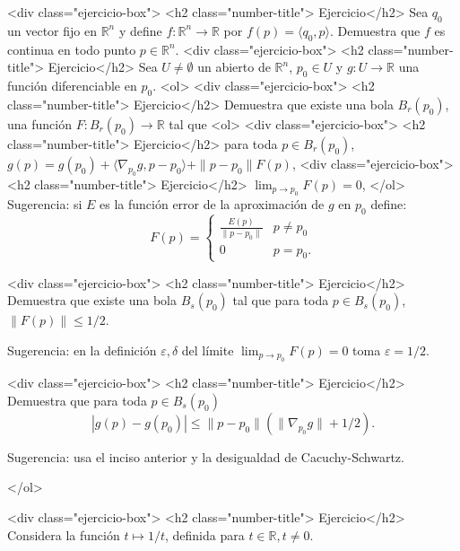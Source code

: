 \documentclass{article}
\theoremstyle{definition}
\begin{document}
  
          <div class="ejercicio-box"> <h2 class="number-title"> Ejercicio</h2> Sea $q_0$ un vector fijo en $\mathbb{R}^n$ y define $f:\mathbb{R}^n \to \mathbb{R}$
            por $f(p)=\langle q_0, p \rangle$. Demuestra que $f$ es continua en todo punto $p \in \mathbb{R}^n$.
           <div class="ejercicio-box"> <h2 class="number-title"> Ejercicio</h2>\label{Ejer:AproxLinealReglaCadena} 
            Sea $U\ne \emptyset$ un abierto de $\mathbb{R}^n$, $p_0\in U $ y $g:U \to \mathbb{R}$
            una función diferenciable en $p_0$.
            <ol>
            <div class="ejercicio-box"> <h2 class="number-title"> Ejercicio</h2> Demuestra que existe una bola $B_r(p_0)$, una función
              $F:B_{r}(p_0) \to \mathbb{R}$ tal que
              <ol>
              <div class="ejercicio-box"> <h2 class="number-title"> Ejercicio</h2> para toda $p\in B_r(p_0)$, $g(p)=g(p_0)+\langle \nabla_{p_0}g, p-p_0\rangle +\|p-p_0\|F(p)$,
              <div class="ejercicio-box"> <h2 class="number-title"> Ejercicio</h2> $\lim_{p\to p_0}F(p)=0$,
              </ol>
              Sugerencia: si $E$ es la función error de la aproximación de $g$ en $p_0$ define:
              $$
              F(p)=\left\{
                \begin{array}{cc}
                  \frac{E(p)}{\|p-p_0\|} & p\ne p_0 \\
                  0 & p=p_0.
                \end{array}
              \right.
              $$

            <div class="ejercicio-box"> <h2 class="number-title"> Ejercicio</h2> Demuestra que existe una bola $B_s(p_0)$ tal que para toda $p\in B_s(p_0)$,
              $\|F(p)\|\leq 1/2$.

              Sugerencia: en la definición $\varepsilon,\delta$ del límite $\lim_{p\to p_0}F(p)=0$
              toma $\varepsilon =1/2$.
              
            <div class="ejercicio-box"> <h2 class="number-title"> Ejercicio</h2> Demuestra que  para toda $p\in B_s(p_0)$
              $$
              |g(p)-g(p_0)|\leq \|p-p_0\| (\|\nabla_{p_0}g\|+1/2).
              $$

              Sugerencia: usa el inciso anterior y la desigualdad de Cacuchy-Schwartz.
              
            </ol>

            <div class="ejercicio-box"> <h2 class="number-title"> Ejercicio</h2>  Considera la función  $t\mapsto 1/t$, definida para $t\in \mathbb{R}, t\ne 0$.
\end{document}
